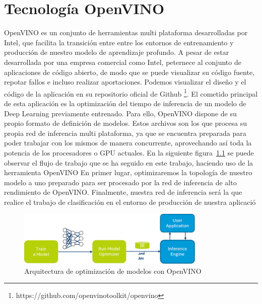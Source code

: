 \cleardoublepage
\mbox{}

\lstset{
language=Python,
basicstyle=\small\sffamily,
numbers=left,
numberstyle=\tiny,
frame=tb,
columns=fullflexible,
showstringspaces=false
}

\chapter{Tecnología OpenVINO}
\label{ch:chapter3}

OpenVINO es un conjunto de herramientas multi plataforma desarrolladas por Intel, que facilita la transición entre entre los entornos de entrenamiento y producción de nuestro modelo de aprendizaje profundo.
A pesar de estar desarrollada por una empresa comercial como Intel, peternece al conjunto de aplicaciones de código abierto, de modo que se puede visualizar su código fuente, repotar fallos e incluso realizar aportaciones.
Podemos visualizar el diseño y el código de la aplicación en su repositorio oficial de Github \footnote{https://github.com/openvinotoolkit/openvino}.
El cometido principal de esta aplicación es la optimización del tiempo de inferencia de un modelo de Deep Learning previamente entrenado.
Para ello, OpenVINO dispone de su propio formato de definición de modelos.
Estos archivos son los que procesa su propia red de inferencia multi plataforma, ya que se encuentra preparada para poder trabajar con los mismos de manera concurrente, aprovechando así toda la potencia de los procesadores o GPU actuales.
En la siguiente figura~\ref{fig:Arquitectura de optimización de modelos con OpenVINO} se puede observar el flujo de trabajo que se ha seguido en este trabajo, haciendo uso de la herramienta OpenVINO
En primer lugar, optimizaremos la topología de nuestro modelo a uno preparado para ser procesado por la red de inferencia de alto rendimiento de OpenVINO\@.
Finalmente, nuestra red de inferencia será la que realice el trabajo de clasificación en el entorno de producción de nuestra aplicació



\begin{figure}
    \centering
    \includegraphics[width=0.8\textwidth]{images/chapter3/openvino_workflow.png}
    \caption{Arquitectura de optimización de modelos con OpenVINO}
    \label{fig:Arquitectura de optimización de modelos con OpenVINO}
\end{figure}


